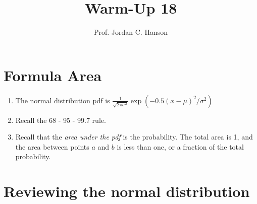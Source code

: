 \documentclass{article}
\begin{document}
\title{Warm-Up 18}
\author{Prof. Jordan C. Hanson}

\maketitle

\section{Formula Area}

\begin{enumerate}
\item The normal distribution pdf is $\frac{1}{\sqrt{2\pi \sigma^2}} \exp(-0.5(x-\mu)^2/\sigma^2)$
\item Recall the 68 - 95 - 99.7 rule.
\item Recall that the \textit{area under the pdf} is the probability.  The total area is 1, and the area between points $a$ and $b$ is less than one, or a fraction of the total probability.
\end{enumerate}

\section{Reviewing the normal distribution}
\end{document}
